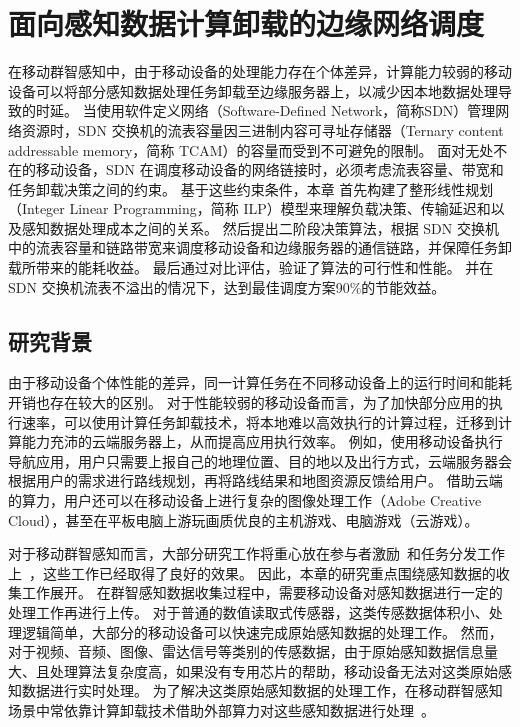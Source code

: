 \chapter{面向感知数据计算卸载的边缘网络调度}

在移动群智感知中，由于移动设备的处理能力存在个体差异，计算能力较弱的移动设备可以将部分感知数据处理任务卸载至边缘服务器上，以减少因本地数据处理导致的时延。
当使用软件定义网络（Software-Defined Network，简称SDN）管理网络资源时，SDN 交换机的流表容量因三进制内容可寻址存储器（Ternary content addressable memory，简称 TCAM）的容量而受到不可避免的限制。
面对无处不在的移动设备，SDN 在调度移动设备的网络链接时，必须考虑流表容量、带宽和任务卸载决策之间的约束。
基于这些约束条件，本章 首先构建了整形线性规划（Integer Linear Programming，简称 ILP）模型来理解负载决策、传输延迟和以及感知数据处理成本之间的关系。
然后提出二阶段决策算法，根据 SDN 交换机中的流表容量和链路带宽来调度移动设备和边缘服务器的通信链路，并保障任务卸载所带来的能耗收益。
最后通过对比评估，验证了算法的可行性和性能。
并在 SDN 交换机流表不溢出的情况下，达到最佳调度方案90\%的节能效益。

\section{研究背景}

由于移动设备个体性能的差异，同一计算任务在不同移动设备上的运行时间和能耗开销也存在较大的区别。
对于性能较弱的移动设备而言，为了加快部分应用的执行速率，可以使用计算任务卸载技术，将本地难以高效执行的计算过程，迁移到计算能力充沛的云端服务器上，从而提高应用执行效率。
例如，使用移动设备执行导航应用，用户只需要上报自己的地理位置、目的地以及出行方式，云端服务器会根据用户的需求进行路线规划，再将路线结果和地图资源反馈给用户。
借助云端的算力，用户还可以在移动设备上进行复杂的图像处理工作（Adobe Creative Cloud），甚至在平板电脑上游玩画质优良的主机游戏、电脑游戏（云游戏）。

对于移动群智感知而言，大部分研究工作将重心放在参与者激励~\cite{CNKI:JiaChaopeng, DBLP:journals/comsur/ZhangYSLTXM16, CNKI:WuMCSIncentive}和任务分发工作上~\cite{DBLP:conf/huc/LiuGWWYZ16, DBLP:conf/infocom/Xiao0HWL15, DBLP:conf/mass/LiLW15}，这些工作已经取得了良好的效果。
因此，本章的研究重点围绕感知数据的收集工作展开。
在群智感知数据收集过程中，需要移动设备对感知数据进行一定的处理工作再进行上传。
对于普通的数值读取式传感器，这类传感数据体积小、处理逻辑简单，大部分的移动设备可以快速完成原始感知数据的处理工作。
然而，对于视频、音频、图像、雷达信号等类别的传感数据，由于原始感知数据信息量大、且处理算法复杂度高，如果没有专用芯片的帮助，移动设备无法对这类原始感知数据进行实时处理。
为了解决这类原始感知数据的处理工作，在移动群智感知场景中常依靠计算卸载技术借助外部算力对这些感知数据进行处理~\cite{Lee:2013fj, Linthicum:2017vv, Kumar:2013dq}。

